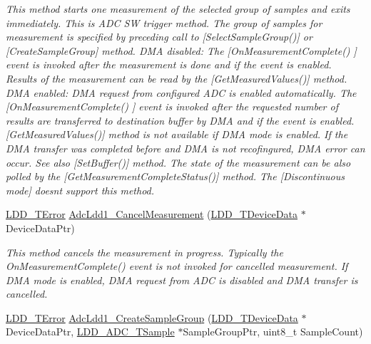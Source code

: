 \begin{DoxyCompactItemize}
\begin{DoxyCompactList}\small\item\em This method starts one measurement of the selected group of samples and exits immediately. This is A\+DC SW trigger method. The group of samples for measurement is specified by preceding call to \mbox{[}Select\+Sample\+Group()\mbox{]} or \mbox{[}Create\+Sample\+Group\mbox{]} method. D\+MA disabled\+: The \mbox{[}On\+Measurement\+Complete() \mbox{]} event is invoked after the measurement is done and if the event is enabled. Results of the measurement can be read by the \mbox{[}Get\+Measured\+Values()\mbox{]} method. D\+MA enabled\+: D\+MA request from configured A\+DC is enabled automatically. The \mbox{[}On\+Measurement\+Complete() \mbox{]} event is invoked after the requested number of results are transferred to destination buffer by D\+MA and if the event is enabled. \mbox{[}Get\+Measured\+Values()\mbox{]} method is not available if D\+MA mode is enabled. If the D\+MA transfer was completed before and D\+MA is not recofingured, D\+MA error can occur. See also \mbox{[}Set\+Buffer()\mbox{]} method. The state of the measurement can be also polled by the \mbox{[}Get\+Measurement\+Complete\+Status()\mbox{]} method. The \mbox{[}Discontinuous mode\mbox{]} doesn\textquotesingle{}t support this method. \end{DoxyCompactList}\item 
\hyperlink{group___p_e___types__module_ga24c2b045fd04e79e85f261ce4df35588}{L\+D\+D\+\_\+\+T\+Error} \hyperlink{group___adc_ldd1__module_ga26924e7e4ca2c272140fbaf6ecf9c18d}{Adc\+Ldd1\+\_\+\+Cancel\+Measurement} (\hyperlink{group___p_e___types__module_gac5cf1362f1f0e3a2ce71b1bf2276d091}{L\+D\+D\+\_\+\+T\+Device\+Data} $\ast$Device\+Data\+Ptr)
\begin{DoxyCompactList}\small\item\em This method cancels the measurement in progress. Typically the On\+Measurement\+Complete() event is not invoked for cancelled measurement. If D\+MA mode is enabled, D\+MA request from A\+DC is disabled and D\+MA transfer is cancelled. \end{DoxyCompactList}\item 
\hyperlink{group___p_e___types__module_ga24c2b045fd04e79e85f261ce4df35588}{L\+D\+D\+\_\+\+T\+Error} \hyperlink{group___adc_ldd1__module_ga86203c058acad0397b653ce3a4a625a4}{Adc\+Ldd1\+\_\+\+Create\+Sample\+Group} (\hyperlink{group___p_e___types__module_gac5cf1362f1f0e3a2ce71b1bf2276d091}{L\+D\+D\+\_\+\+T\+Device\+Data} $\ast$Device\+Data\+Ptr, \hyperlink{struct_l_d_d___a_d_c___t_sample}{L\+D\+D\+\_\+\+A\+D\+C\+\_\+\+T\+Sample} $\ast$Sample\+Group\+Ptr, uint8\+\_\+t Sample\+Count)

\end{DoxyCompactItemize}
